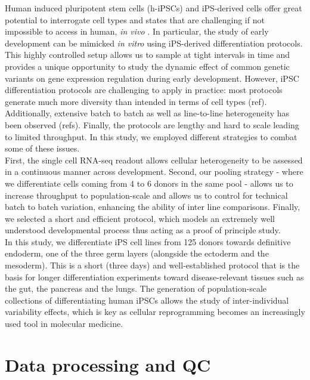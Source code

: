 Human induced pluripotent stem cells (h-iPSCs) and iPS-derived cells offer great potential to interrogate cell types and states that are challenging if not impossible to access in human, \textit{in vivo} \cite{kilpinen2017common}.
In particular, the study of early development can be mimicked \textit{in vitro} using iPS-derived differentiation protocols. 
This highly controlled setup allows us to sample at tight intervals in time and provides a unique opportunity to study the dynamic effect of common genetic variants on gene expression regulation during early development.
However, iPSC differentiation protocols are challenging to apply in practice: most protocols generate much more diversity than intended in terms of cell types (ref). 
Additionally, extensive batch to batch as well as line-to-line heterogeneity has been observed (refs). 
Finally, the protocols are lengthy and hard to scale leading to limited throughput. 
In this study, we employed different strategies to combat some of these issues.\\ 

First, the single cell RNA-seq readout allows cellular heterogeneity to be assessed in a continuous manner across development.
Second, our pooling strategy - where we differentiate cells coming from 4 to 6 donors in the same pool - allows us to increase throughput to population-scale and allows us to control for technical batch to batch variation, enhancing the ability of inter line comparisons.
Finally, we selected a short and efficient protocol, which models an extremely well understood developmental process thus acting as a proof of principle study.\\

In this study, we differentiate iPS cell lines from 125 donors towards definitive endoderm, one of the three germ layers (alongside the ectoderm and the mesoderm). 
This is a short (three days) and well-established protocol \cite{hannan2013production} that is the basis for longer differentiation experiments toward disease-relevant tissues such as the gut, the pancreas and the lungs.
The generation of population-scale collections of differentiating human iPSCs allows the study of inter-individual variability effects, which is key as cellular reprogramming becomes an increasingly used tool in molecular medicine.


\section{Data processing and QC}

